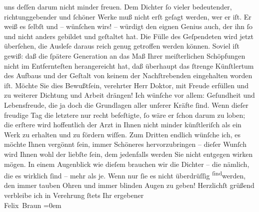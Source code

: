 \begin{ledgroupsized}[t]{13cm}
                    uns deſſen darum nicht minder freuen.\pend
           \pstart
           {\pb}Dem Dichter ſo vieler bedeutender,
                    richtunggebender und ſchöner Werke muß nicht erſt geſagt werden, wer er iſt. Er
                    weiß es ſelbſt und – wünſchen wirs! – würdigt den eignen Genius auch, der ihn ſo
                    und nicht anders gebildet und geſtaltet hat. Die Fülle des Geſpendeten wird
                    jetzt überſehen, die Ausleſe daraus reich genug getroffen werden können. Soviel
                    iſt gewiß: daß die ſpätere Generation an das Maß Ihrer meiſterlichen Schöpfungen
                    nicht im Entfernteſten herangereicht hat, daß überhaupt das ſtrenge Künſtlertum
                    des Aufbaus und der Geſtalt von keinem der Nachſtrebenden eingehalten worden
                    iſt. Möchte Sie dies Bewußtſein, verehrter Herr Doktor, mit Freude erfüllen und
                    zu weiterer Dichtung und Arbeit drängen!\pend
           \pstart
           Ich wünſche vor allem: Geſundheit und Lebensfreude, die ja doch die Grundlagen
                    aller unſerer Kräfte ſind. Wenn dieſer freudige {\pb}Tag die letztere nur recht befeſtigte, ſo wäre er ſchon darum zu loben; die
                    erſtere wird hoffentlich der Arzt in Ihnen nicht minder künſtleriſch als ein
                    Werk zu erhalten und zu fördern wiſſen. Zum Dritten endlich wünſche ich, es
                    möchte Ihnen vergönnt ſein, immer Schöneres hervorzubringen – dieſer Wunſch wird
                    Ihnen wohl der liebſte ſein, dem jedenfalls werden Sie nicht entgegen wirken
                    mögen. In einem Augenblick wie dieſem brauchen wir die Dichter – die nämlich,
                    die es wirklich ſind – mehr als je. Wenn nur ſie es nicht überdrüſſig \substVorne{}\textsuperscript{ſind}\substDazwischen{}werden\substHinten{}, den immer tauben Ohren und immer blinden Augen zu geben!\pend
           \pstart
           Herzlichſt grüßend verbleibe ich in Verehrung ſtets Ihr ergebener{\\[\baselineskip]}\spacefill\mbox{Felix Braun}\pend
           \leftskip=0em{}
         
         \endnumbering{}\end{ledgroupsized}  \newcommand{\dateiname}{L02381}\newcommand{\titel}{Felix Braun an Arthur Schnitzler, 13. 5. 1922}\newcommand{\editorInnen}{Martin Anton Müller und Gerd-Hermann Susen}
      